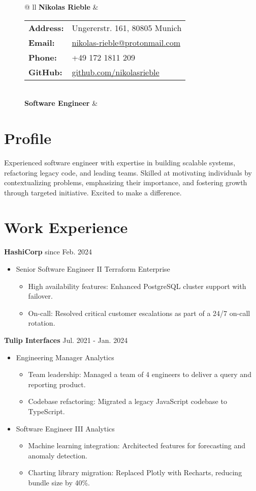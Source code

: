 \documentclass[letterpaper,11pt]{article}
\newcommand{\roleSpacing}{\vspace{4pt}}
\newcommand{\role}[2]{\item{#1 \hfill #2 \\}} %
\newcommand{\station}[2]{\textbf{#1}  \hfill #2 \\} %
\newcommand{\project}[2]{\item\small{#1: #2}} %
\newcommand{\resumeSubHeadingListStart}{\begin{itemize}[leftmargin=*]}
\newcommand{\resumeSubHeadingListEnd}{\end{itemize}}
\newcommand{\projectliststart}{\begin{itemize}[leftmargin=*] \vspace{-5pt} }
\newcommand{\projectlistend}{\end{itemize}\vspace{-5pt}}
\begin{document}
\addtolength{\tabcolsep}{4pt}    %
{\renewcommand{\arraystretch}{1} %
\begin{figure}[t]
	\centering
	\begin{tabular*}{\textwidth}{@{\extracolsep{\fill}} ll}
		 \textbf{{\Huge Nikolas Rieble}} & 
		\begin{tabular}{@{}ll@{}}
			\textbf{Address:} & Ungererstr. 161, 80805 Munich \\
			\textbf{Email:} & \href{mailto:nikolas-rieble@protonmail.com}{nikolas-rieble@protonmail.com} \\
			\textbf{Phone:} & +49 172 1811 209 \\
			\textbf{GitHub:} & \href{https://github.com/nikolasrieble}{github.com/nikolasrieble} \\
		\end{tabular} \\
		\textbf{Software Engineer} & \\
	\end{tabular*}
\end{figure}
}

\section{Profile}
Experienced software engineer with expertise in building scalable systems, refactoring legacy code, and leading teams. Skilled at motivating individuals by contextualizing problems, emphasizing their importance, and fostering growth through targeted initiative. Excited to make a difference.

\section{Work Experience}

\station{HashiCorp}{since Feb. 2024}
\resumeSubHeadingListStart
\role{Senior Software Engineer II}{Terraform Enterprise}
\projectliststart
\project{High availability features}{Enhanced PostgreSQL cluster support with failover.}
\project{On-call}{Resolved critical customer escalations as part of a 24/7 on-call rotation.}
\projectlistend
\resumeSubHeadingListEnd

\roleSpacing

\station{Tulip Interfaces}{Jul. 2021 - Jan. 2024}
\resumeSubHeadingListStart
\role{Engineering Manager}{Analytics}
\projectliststart
\project{Team leadership}{Managed a team of 4 engineers to deliver a query and reporting product.}
\project{Codebase refactoring}{Migrated a legacy JavaScript codebase to TypeScript.}
\projectlistend
\roleSpacing
\role{Software Engineer III}{Analytics}
\projectliststart
\project{Machine learning integration}{Architected features for forecasting and anomaly detection.}
\project{Charting library migration}{Replaced Plotly with Recharts, reducing bundle size by 40\%.}
\projectlistend
\resumeSubHeadingListEnd
\end{document}
